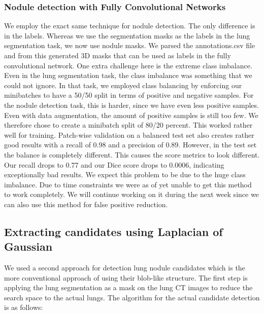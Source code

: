 \documentclass{article}
\begin{document}
\subsubsection{Nodule detection with Fully Convolutional Networks}
We employ the exact same technique for nodule detection. The only difference is in the labels. Whereas we use the segmentation masks as the labels in the lung segmentation task, we now use nodule masks. We parsed the annotations.csv file and from this generated 3D masks that can be used as labels in the fully convolutional network. One extra challenge here is the extreme class imbalance. Even in the lung segmentation task, the class imbalance was something that we could not ignore. In that task, we employed class balancing by enforcing our minibatches to have a 50/50 split in terms of positive and negative samples. For the nodule detection task, this is harder, since we have even less positive samples. Even with data augmentation, the amount of positive samples is still too few. We therefore chose to create a minibatch split of 80/20 percent. This worked rather well for training. Patch-wise validation on a balanced test set also creates rather good results with a recall of 0.98 and a precision of 0.89. However, in the test set the balance is completely different. This causes the score metrics to look different. Our recall drops to 0.77 and our Dice score drops to 0.0006, indicating exceptionally bad results. We expect this problem to be due to the huge class imbalance. Due to time constraints we were as of yet unable to get this method to work completely. We will continue working on it during the next week since we can also use this method for false positive reduction.

\subsection{Extracting candidates using Laplacian of Gaussian}
We used a second approach for detection lung nodule candidates which is the more conventional approach of using their blob-like structure. The first step is applying the lung segmentation as a mask on the lung CT images to reduce the search space to the actual lungs. The algorithm for the actual candidate detection is as follows:
\end{document}
